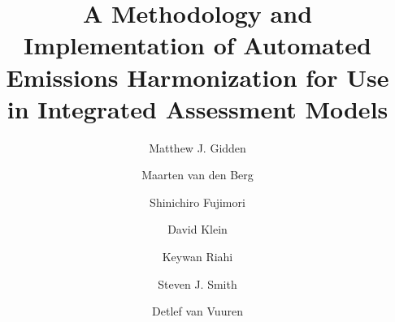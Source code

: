 \begin{frontmatter}

\title{A Methodology and Implementation of Automated Emissions Harmonization for Use in Integrated Assessment Models}

\author[iiasa]{Matthew J. Gidden}

\author[pbl]{Maarten van den Berg}
\author[nies]{Shinichiro Fujimori}
\author[pik]{David Klein}
\author[iiasa]{Keywan Riahi}
\author[pnnl]{Steven J. Smith}
\author[pbl]{Detlef van Vuuren}

\address[iiasa]{International Institute for Applied Systems Analysis,
  Schlossplatz 1, A-2361 Laxenburg, Austria}
\address[nies]{National Institute for Environmental Studies, Tsukuba, Japan}
\address[pbl]{PBL Netherlands Environmental Assessment Agency, Postbus 30314, 2500 GH The Hague, Netherlands}
\address[pik]{Potsdam Institute for Climate Impact Research, Telegraphenberg A 31, 14473 Potsdam, Germany}
\address[pnnl]{Joint Global Change Research Institute, 5825 University Research Court, Suite 3500, College Park, MD 20740}


\end{frontmatter}
